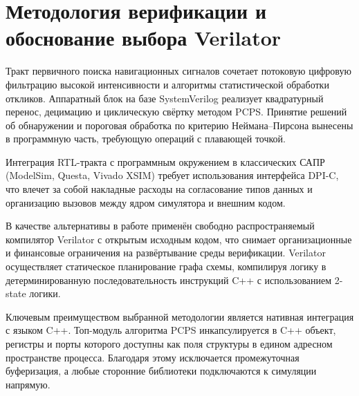 \section{Методология верификации и обоснование выбора Verilator}

Тракт первичного поиска навигационных сигналов сочетает потоковую цифровую фильтрацию высокой интенсивности и алгоритмы статистической обработки откликов. Аппаратный блок на базе SystemVerilog реализует квадратурный перенос, децимацию и циклическую свёртку методом PCPS. Принятие решений об обнаружении и пороговая обработка по критерию Неймана--Пирсона вынесены в программную часть, требующую операций с плавающей точкой.

Интеграция RTL-тракта с программным окружением в классических САПР (ModelSim, Questa, Vivado XSIM) требует использования интерфейса DPI-C, что влечет за собой накладные расходы на согласование типов данных и организацию вызовов между ядром симулятора и внешним кодом.

В качестве альтернативы в работе применён свободно распространяемый компилятор Verilator с открытым исходным кодом, что снимает организационные и финансовые ограничения на развёртывание среды верификации. Verilator осуществляет статическое планирование графа схемы, компилируя логику в детерминированную последовательность инструкций C++ с использованием 2-state логики.

Ключевым преимуществом выбранной методологии является нативная интеграция с языком C++. Топ-модуль алгоритма PCPS инкапсулируется в C++ объект, регистры и порты которого доступны как поля структуры в едином адресном пространстве процесса. Благодаря этому исключается промежуточная буферизация, а любые сторонние библиотеки подключаются к симуляции напрямую.
